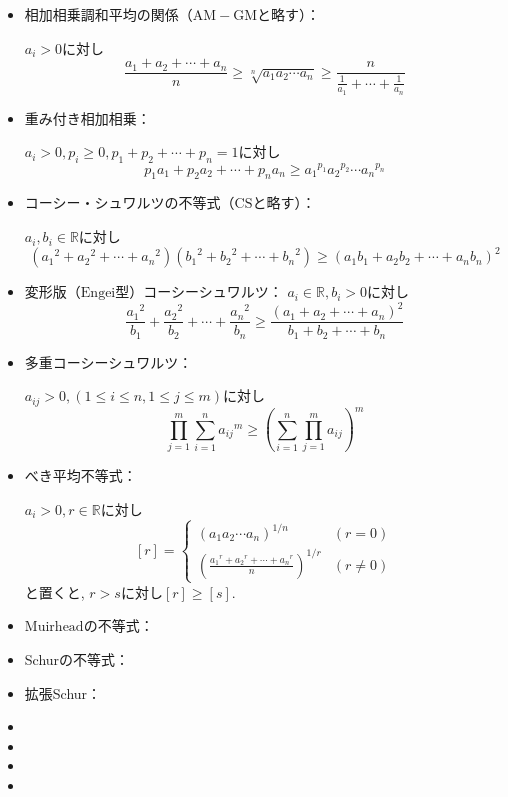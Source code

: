 \documentclass[uplatex, a5paper]{jsarticle}
\theoremstyle{definition}
\begin{document}
\begin{itemize}
 \item 相加相乗調和平均の関係（$\mathrm{AM-GM}$と略す）：

 $a_i >0$に対し
 $$
 \frac{a_1+a_2+\cdots + a_n }{n} \geq \sqrt[n]{a_1a_2\cdots a_n } \geq \frac{n}{\frac{1}{a_1}+\cdots + \frac{1}{a_n}}
 $$

 \item 重み付き相加相乗：

$a_i > 0 , p_i \geq 0 , p_1+p_2+ \cdots + p_n =1$に対し
$$
p_1a_1+p_2a_2 + \cdots + p_na_n \geq {a_1}^{p_1}{a_2}^{p_2}\cdots {a_n}^{p_n}
$$

 \item コーシー・シュワルツの不等式（$\mathrm{CS}$と略す）：

 $a_i,b_i \in \mathbb{R}$に対し
 $$
 ({a_1}^2+ {a_2}^2+ \cdots + {a_n}^2)({b_1}^2+ {b_2}^2+ \cdots + {b_n}^2) \geq (a_1b_1+ a_2b_2 + \cdots + a_nb_n)^2
 $$
  \item 変形版（$\mathrm{Engei}$型）コーシーシュワルツ：
 $a_i \in \mathbb{R} ,b_i >0$に対し
 $$
 \frac{{a_1}^2}{b_1} + \frac{{a_2}^2}{b_2} + \cdots + \frac{{a_n}^2}{b_n} \geq \frac{(a_1+a_2+ \cdots + a_n)^2 }{b_1+b_2+ \cdots + b_n}
 $$

 \item 多重コーシーシュワルツ：

 $a_{ij} > 0 , (1 \leq i \leq n , 1 \leq j \leq m)$に対し
 $$
 \prod_{j=1}^m \sum_{i=1}^n {a_{ij}}^m \geq \left( \sum_{i=1}^n \prod_{j=1}^m a_{ij} \right) ^m
 $$

 \item べき平均不等式：

 $a_i > 0 , r \in \mathbb{R}$に対し
\[
  [r] = \begin{cases}
    \left( a_1a_2\cdots a_n \right) ^{1/n} & (r=0) \\
    \left( \displaystyle\frac{ {a_1}^r + {a_2}^r + \cdots + {a_n}^r }{n} \right) ^{1/r} & (r\neq 0)
  \end{cases}
\]
と置くと, $ r > s $に対し$[r] \geq [s] $.

 \item $\mathrm{Muirhead}$の不等式：
 \item Schurの不等式：
 \item 拡張Schur：


 \item

 \item
 \item
 \item
\end{itemize}
\end{document}
